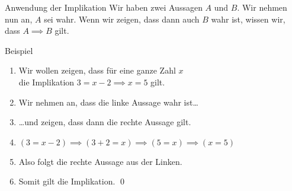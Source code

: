\begin{frame}{Anwendung der Implikation}
    Wir haben zwei Aussagen $A$ und $B$. Wir nehmen nun an, $A$ sei wahr. Wenn wir zeigen, dass dann auch $B$ wahr ist, wissen wir, dass $A \implies B$ gilt.
\begin{exampleblock}{Beispiel}
\begin{enumerate}
    \item<1-> Wir wollen zeigen, dass für eine ganze Zahl $x$ \\
    die Implikation $3 = x - 2 \implies x = 5$ gilt.
    \item<2-> Wir nehmen an, dass die linke Aussage wahr ist\dots
    \item<3-> \dots und zeigen, dass dann die rechte Aussage gilt.
    \item<4-> $(3 = x - 2) \implies (3 + 2 = x) \implies (5 = x) \implies (x = 5)$
    \item<5-> Also folgt die rechte Aussage aus der Linken.
    \item<6-> Somit gilt die Implikation. \qed\;
\end{enumerate}
\end{exampleblock}
\end{frame}
